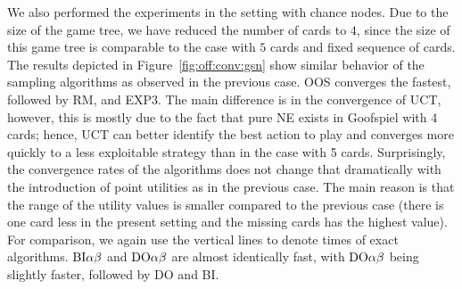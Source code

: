 {We also performed the experiments in the setting with chance nodes.
Due to the size of the game tree, we have reduced the number of cards to $4$, since the size of this game tree is comparable to the case with $5$ cards and fixed sequence of cards.
The results depicted in Figure~\ref{fig:off:conv:gsn} show similar behavior of the sampling algorithms as observed in the previous case.
OOS converges the fastest, followed by RM, and EXP3.
The main difference is in the convergence of UCT, however, this is mostly due to the fact that pure NE exists in Goofspiel with 4 cards; hence, UCT can better
identify the best action to play and converges more quickly to a less exploitable strategy than in the case with 5 cards.
Surprisingly, the convergence rates of the algorithms does not change that dramatically with the introduction of point utilities as in the previous case.
The main reason is that the range of the utility values is smaller compared to the previous case (there is one card less in the present setting and the missing cards has the highest value).
For comparison, we again use the vertical lines to denote times of exact algorithms.
$\textrm{BI}\alpha\beta$ and $\textrm{DO}\alpha\beta$ are almost identically fast, with $\textrm{DO}\alpha\beta$ being slightly faster, followed by \textsc{DO} and \textsc{BI}.
}

